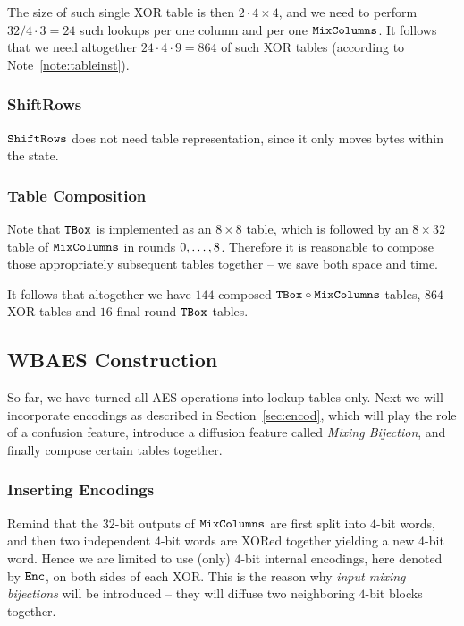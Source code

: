 	The size of such single XOR table is then $2\cdot 4\times 4$, and we need to perform $32/4\cdot 3=24$ such lookups per one column and per one $\texttt{MixColumns}$. It follows that we need altogether $24\cdot 4\cdot 9 = 864$ of such XOR tables (according to Note~\ref{note:tableinst}).

\subsubsection{ShiftRows}
	
	$\texttt{ShiftRows}$ does not need table representation, since it only moves bytes within the state.

\subsubsection{Table Composition}
	
	Note that $\texttt{TBox}$ is implemented as an $8\times 8$ table, which is followed by an $8\times 32$ table of $\texttt{MixColumns}$ in rounds $0 , \ldots , 8$. Therefore it is reasonable to compose those appropriately subsequent tables together -- we save both space and time.
	
	It follows that altogether we have $144$ composed $\texttt{TBox}\circ\texttt{MixColumns}$ tables, $864$ XOR tables and $16$ final round $\texttt{TBox}$ tables.



\subsection{WBAES Construction}
\label{sec:constrwbaes}

So far, we have turned all AES operations into lookup tables only. Next we will incorporate encodings as described in Section~\ref{sec:encod}, which will play the role of a confusion feature, introduce a diffusion feature called {\em Mixing Bijection}, and finally compose certain tables together.

\subsubsection{Inserting Encodings}
	
	Remind that the $32$-bit outputs of $\texttt{MixColumns}$ are first split into $4$-bit words, and then two independent $4$-bit words are XORed together yielding a new $4$-bit word. Hence we are limited to use (only) $4$-bit internal encodings, here denoted by $\texttt{Enc}$, on both sides of each XOR. This is the reason why {\em input mixing bijections} will be introduced -- they will diffuse two neighboring $4$-bit blocks together.
	
